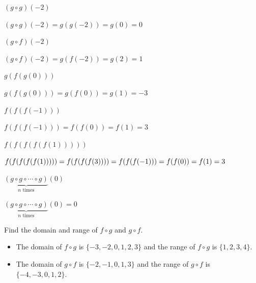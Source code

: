 \documentclass{ximera}
\begin{document}
\begin{question}
\begin{problem}
$(g \circ g)(-2)$

\begin{solution}
    $(g \circ g)(-2) = g(g(-2)) = g(0) = 0$
\end{solution}
\end{problem}

\begin{problem}
$(g \circ f)(-2)$

\begin{solution}
    $(g \circ f)(-2) = g(f(-2)) = g(2) = 1$
\end{solution}
\end{problem}

\begin{problem}
$g(f(g(0)))$

\begin{solution}
    $g(f(g(0))) = g(f(0)) = g(1) = -3$
\end{solution}
\end{problem}

\begin{problem}
$f(f(f(-1)))$

\begin{solution}
    $f(f(f(-1))) = f(f(0)) = f(1) = 3$
\end{solution}
\end{problem}

\begin{problem}
$f(f(f(f(f(1)))))$

\begin{solution}
    $f(f(f(f(f(1))))) = f(f(f(f(3)))) =\\ f(f(f(-1))) = f(f(0))  = f(1) = 3$
\end{solution}
\end{problem}

\begin{problem}
$\underbrace{(g \circ g \circ \cdots \circ g)}_{\mbox{$n$ times}}(0)$ 

\begin{solution}
     $\underbrace{(g \circ g \circ \cdots \circ g)}_{\mbox{$n$ times}}(0) = 0$
\end{solution}
\end{problem} 

\begin{problem}\label{pointcompexlast}
Find the domain and range of $f \circ g$ and $g \circ f$. 

\begin{solution}
\begin{itemize}  \item  The domain of $f \circ g$ is $\{ -3, -2, 0, 1, 2, 3\}$ and the range of $f \circ g$ is $\{1, 2, 3, 4\}$.
\item The domain of $g \circ f$ is $\{ -2, -1, 0, 1, 3 \}$ and the range of $g \circ f$ is $\{ -4, -3, 0, 1, 2 \}$.

\end{itemize}
\end{solution}
\end{problem}  

\end{question}
\end{document}
